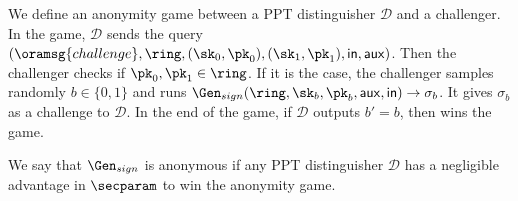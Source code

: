 	\begin{definition}\label{def:anonymity}
		We define an anonymity game between a PPT distinguisher $ \mathcal{D} $ and a challenger.
		In the game, $\mathcal{D}$ sends the query  $ (\oramsg{challenge}, \ring, (\sk_0,\pk_0), (\sk_1, \pk_1), \msg,\aux)$. Then the challenger checks if  $ \pk_0, \pk_1 \in \ring $. If it is the case, the challenger samples randomly  $ b\in \{0,1\}  $ and runs $ \Gen_{sign}(\ring, \sk_b, \pk_b,\aux, \msg) \rightarrow \sigma_b $. It gives $ \sigma_b $ as a challenge to $ \mathcal{D} $. In the end of the game, if $ \mathcal{D} $ outputs $ b' = b $, then wins the game.
			
		We say that $ \Gen_{sign} $ is anonymous  if any PPT distinguisher $ \mathcal{D} $ has a negligible advantage in $ \secparam $ to win the anonymity game.
	\end{definition}
	
	
	
	
